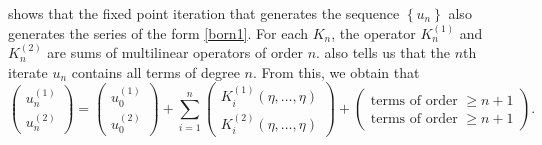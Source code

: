 \documentclass[a4paper, 12pt]{article}
\begin{document}
 shows that the fixed point iteration that generates the sequence $\left\{ u_{n} \right\} $ also generates the series of the form \cref{born1}.
 For each $K_{n}$, the operator $K_n^{(1)}$ and $K_{n}^{(2)}$ are sums of multilinear operators of order $n$.
  also tells us that the $n$th iterate $u_{n}$ contains all terms of degree $n$.
 From this, we obtain that
\[
\begin{pmatrix} u_n^{(1)}\\u_n^{(2)} \end{pmatrix}
= \begin{pmatrix} u_0^{(1)}\\u_0^{(2)} \end{pmatrix}
+ \sum_{i=1}^{n} \begin{pmatrix} K_i^{(1)}\left( \eta,\ldots,\eta \right)\\K_i^{(2)} \left( \eta,\ldots,\eta \right)\end{pmatrix}
+\begin{pmatrix} \text{terms of order $\ge n + 1$}\\ \text{terms of order $\ge n + 1$}\end{pmatrix}
.\]
\end{document}
